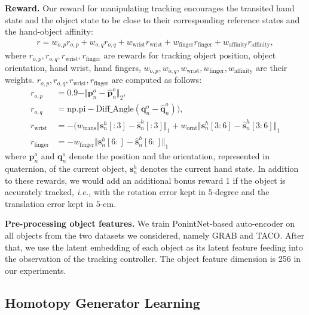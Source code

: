 \noindent\textbf{Reward.} Our reward for manipulating tracking encourages the transited hand state and the object state to be close to their corresponding reference states and the hand-object affinity: 
\begin{align}
    r = w_{o, p} r_{o, p} + w_{o, q} r_{o, q} + w_{\text{wrist}} r_{\text{wrist}} + w_{\text{finger}} r_{\text{finger}} + w_{\text{affinity}} r_{\text{affinity}}, \label{eq_rew}
\end{align}
where $r_{o,p},r_{o, q},r_{\text{wrist}},r_{\text{finger}}$ are rewards for tracking object position, object orientation, hand wrist, hand fingers, $w_{o, p},  w_{o, q}, w_{\text{wrist}}, w_{\text{finger}},  w_{\text{affinity}}$ are their weights. 
 $r_{o,p},r_{o, q},r_{\text{wrist}},r_{\text{finger}}$ are computed as follows:
\begin{align}
    r_{o,p} &= 0.9 - \Vert \mathbf{p}_n^o - \hat{\mathbf{p}}_n^o \Vert_2, \\
    r_{o,q} &= \text{np.pi} - \text{Diff\_Angle}(\mathbf{q}_n^o - \hat{\mathbf{q}}_n^o )), \\
    r_{\text{wrist}} &= -(w_{\text{trans}} \Vert \mathbf{s}_n^h[:3] - \hat{\mathbf{s}}_n^h[:3] \Vert_1 + w_{\text{ornt}} \Vert \mathbf{s}_n^h[3:6] - \hat{\mathbf{s}}_n^h[3:6] \Vert_1 \\
    r_{\text{finger}} &= -w_{\text{finger}} \Vert \mathbf{s}_n^h[6:] - \hat{\mathbf{s}}_n^h[6:] \Vert_1 
\end{align}
where $\mathbf{p}^o_n$ and $\mathbf{q}_n^o$ denote the position and the orientation, represented in quaternion, of the current object, $\mathbf{s}_n^h$ denotes the current hand state. In addition to these rewards, we would add an additional bonus reward $1$ if the object is accurately tracked, \emph{i.e.,} with the rotation error kept in $5$-degree and the translation error kept in $5$-cm. 


\noindent\textbf{Pre-processing object features.} We train PonintNet-based auto-encoder on all objects from the two datasets we considered, namely GRAB and TACO. After that, we use the latent embedding of each object as its latent feature feeding into the observation of the tracking controller. The object feature dimension is 256 in our experiments. 




\subsection{Homotopy Generator Learning} \label{sec:supp_method_homotopy_generator}

